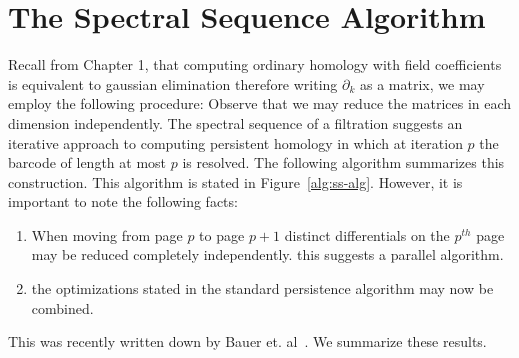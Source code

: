 \section{The Spectral Sequence Algorithm}
\label{sec:persistence-algorithm}
Recall from Chapter 1, that computing ordinary homology with field coefficients is equivalent to gaussian elimination therefore writing $\partial_k$ as a matrix, we may employ the following procedure:
Observe that we may reduce the matrices in each dimension independently.
The spectral sequence of a filtration suggests an iterative approach to computing persistent homology in which at iteration $p$ the barcode of length at most $p$ is resolved. The following algorithm summarizes this construction.
This algorithm is stated in Figure~\ref{alg:ss-alg}. However, it is important to note the following facts:
\begin{enumerate}
\item When moving from page $p$ to page $p+1$ distinct differentials on the $p^{th}$ page may be reduced completely independently. this suggests a parallel algorithm.
\item the optimizations stated in the standard persistence algorithm may now be combined.
\end{enumerate}
This was recently written down by Bauer et. al~\cite{clear_n_compress}. We summarize these results.
